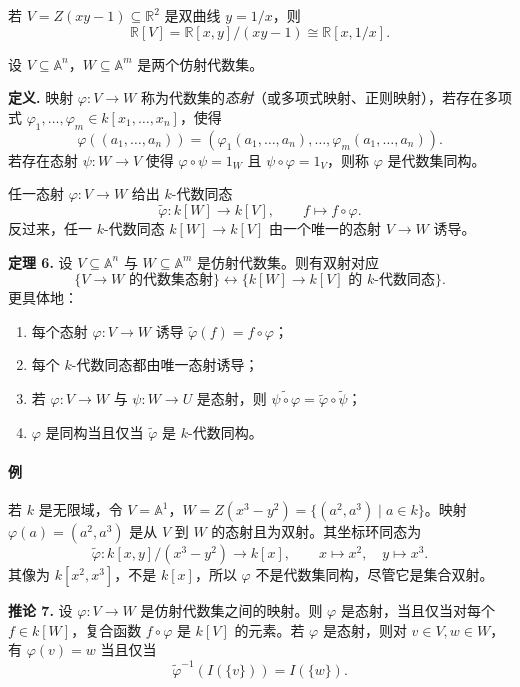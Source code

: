 若 $V=Z(xy-1)\subseteq\mathbb R^2$ 是双曲线 $y=1/x$，则
\[
\mathbb R[V]=\mathbb R[x,y]/(xy-1)\cong \mathbb R[x,1/x].
\]

设 $V\subseteq\mathbb A^n$，$W\subseteq\mathbb A^m$ 是两个仿射代数集。

\noindent\textbf{定义.} 映射 $\varphi:V\to W$ 称为代数集的\emph{态射}（或多项式映射、正则映射），若存在多项式 $\varphi_1,\ldots,\varphi_m\in k[x_1,
\ldots,x_n]$，使得
\[
\varphi((a_1,
\ldots,a_n))=(\varphi_1(a_1,
\ldots,a_n),
\ldots,
\varphi_m(a_1,
\ldots,a_n)).
\]
若存在态射 $\psi:W\to V$ 使得 $\varphi\circ\psi=1_W$ 且 $\psi\circ\varphi=1_V$，则称 $\varphi$ 是代数集同构。

任一态射 $\varphi:V\to W$ 给出 $k$-代数同态
\[
\widetilde\varphi:k[W]\longrightarrow k[V],\qquad f\longmapsto f\circ\varphi.
\]
反过来，任一 $k$-代数同态 $k[W]\to k[V]$ 由一个唯一的态射 $V\to W$ 诱导。

\noindent\textbf{定理 6.} 设 $V\subseteq\mathbb A^n$ 与 $W\subseteq\mathbb A^m$ 是仿射代数集。则有双射对应
\[
\{V\to W\text{ 的代数集态射}\}
\longleftrightarrow
\{k[W]\to k[V]\text{ 的 }k\text{-代数同态}\}.
\]
更具体地：
\begin{enumerate}[label=(\arabic*)]
	\item 每个态射 $\varphi:V\to W$ 诱导 $\widetilde\varphi(f)=f\circ\varphi$；
	\item 每个 $k$-代数同态都由唯一态射诱导；
	\item 若 $\varphi:V\to W$ 与 $\psi:W\to U$ 是态射，则 $\widetilde{\psi\circ\varphi}=\widetilde\varphi\circ\widetilde\psi$；
	\item $\varphi$ 是同构当且仅当 $\widetilde\varphi$ 是 $k$-代数同构。
\end{enumerate}

\paragraph{例}
若 $k$ 是无限域，令 $V=\mathbb A^1$，$W=Z(x^3-y^2)=\{(a^2,a^3)\mid a\in k\}$。映射 $\varphi(a)=(a^2,a^3)$ 是从 $V$ 到 $W$ 的态射且为双射。其坐标环同态为
\[
\widetilde\varphi:k[x,y]/(x^3-y^2)\longrightarrow k[x],
\qquad x\mapsto x^2,
\quad y\mapsto x^3.
\]
其像为 $k[x^2,x^3]$，不是 $k[x]$，所以 $\varphi$ 不是代数集同构，尽管它是集合双射。

\noindent\textbf{推论 7.} 设 $\varphi:V\to W$ 是仿射代数集之间的映射。则 $\varphi$ 是态射，当且仅当对每个 $f\in k[W]$，复合函数 $f\circ\varphi$ 是 $k[V]$ 的元素。若 $\varphi$ 是态射，则对 $v\in V,w\in W$，有 $\varphi(v)=w$ 当且仅当
\[
\widetilde\varphi^{-1}(I(\{v\}))=I(\{w\}).
\]


